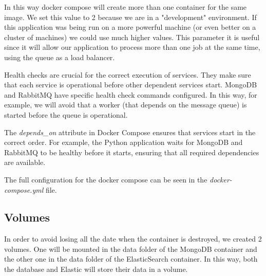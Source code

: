 In this way docker compose will create more than one container for the same
image. We set this value to 2 because we are in a "development" environment.
If this application was being run on a more powerful machine (or even better
on a cluster of machines) we could use much higher values.
This parameter it is useful since it will allow our application to process more
than one job at the same time, using the queue as a load balancer.

Health checks are crucial for the correct execution of services. They make sure
that each service is operational before other dependent services start. MongoDB and
RabbitMQ have specific health check commands configured.
In this way, for example, we will avoid that a worker (that depends on the message
queue) is started before the queue is operational.

The \textit{depends\_on} attribute in Docker Compose ensures that services start
in the correct order. For example, the Python application waits for MongoDB and
RabbitMQ to be healthy before it starts, ensuring that all required
dependencies are available.

The full configuration for the docker compose can be seen in the
\textit{docker-compose.yml} file.

\subsection{Volumes}
In order to avoid losing all the date when the container is destroyed, we created
2 volumes. One will be mounted in the data folder of the MongoDB container and
the other one in the data folder of the ElasticSearch container. In this way,
both the database and Elastic will store their data in a volume.
